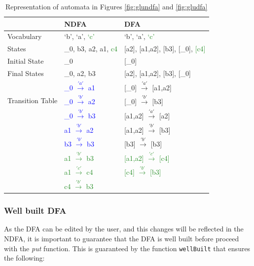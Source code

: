 \begin{table}[H]
  \begin{center}
    \begin{tabular}{ | p{3cm} |p{4cm}||p{4cm}|  }
    \hline
         & NDFA & DFA \\ [1ex]
        \hline
        \hline
        Vocabulary & `b', `a', \textcolor{ForestGreen}{`c'} & `b', `a', \textcolor{ForestGreen}{`c'}\\ [0.7ex]
        \hline
        States & \_0, b3, a2, a1, \textcolor{ForestGreen}{c4} & [a2], [a1,a2], [b3], [\_0], \textcolor{ForestGreen}{[c4]}\\ [0.7ex]
        \hline
        Initial State & \_0 & [\_0] \\ [0.7ex]
        \hline
        Final States & \_0, a2, b3 & [a2], [a1,a2], [b3], [\_0] \\ [0.7ex]
        \hline
        \multirow{3}{5em}{Transition Table} & \textcolor{blue}{\_0 $\xrightarrow{'a'}$ a1} & [\_0] $\xrightarrow{'a'}$ [a1,a2]\\
        & \textcolor{blue}{\_0 $\xrightarrow{'b'}$ a2} & [\_0]    $\xrightarrow{'b'}$ [b3]\\
        & \textcolor{blue}{\_0 $\xrightarrow{'b'}$ b3} & [a1,a2]  $\xrightarrow{'a'}$ [a2]\\
        & \textcolor{blue}{a1  $\xrightarrow{'b'}$ a2} & [a1,a2]  $\xrightarrow{'b'}$ [b3]\\
        & \textcolor{blue}{b3  $\xrightarrow{'b'}$ b3} & [b3]     $\xrightarrow{'b'}$ [b3]\\
        & \textcolor{ForestGreen}{a1  $\xrightarrow{'b'}$ b3} & \textcolor{ForestGreen}{[a1,a2]  $\xrightarrow{'c'}$ [c4]}\\
        & \textcolor{ForestGreen}{a1  $\xrightarrow{'c'}$ c4} & \textcolor{ForestGreen}{[c4]  $\xrightarrow{'b'}$ [b3]}\\
        & \textcolor{ForestGreen}{c4  $\xrightarrow{'b'}$ b3} & \\
        \hline
        \end{tabular}
  \end{center}
  \caption{Representation of automata in Figures \ref{fig:glundfa} and \ref{fig:gludfa}}
  \label{sourceUpdated}
\end{table}

\subsubsection{Well built DFA}
As the DFA can be edited by the user, and this changes will be reflected in the NDFA, it is important to guarantee that the DFA is well built before proceed with the \textit{put} function. This is guaranteed by the function \texttt{wellBuilt} that ensures the following:

